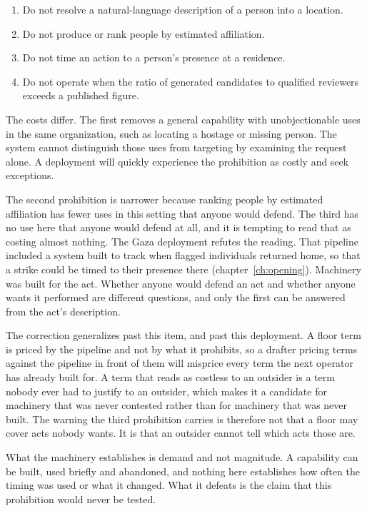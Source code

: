 \begin{enumerate}
  \item Do not resolve a natural-language description of a person into a location.
  \item Do not produce or rank people by estimated affiliation.
  \item Do not time an action to a person's presence at a residence.
  \item Do not operate when the ratio of generated candidates to qualified reviewers exceeds a published figure.
\end{enumerate}

The costs differ. The first removes a general capability with unobjectionable uses in the same organization, such as locating a hostage or missing person. The system cannot distinguish those uses from targeting by examining the request alone. A deployment will quickly experience the prohibition as costly and seek exceptions.

The second prohibition is narrower because ranking people by estimated affiliation has fewer uses in this setting that anyone would defend. The third has no use here that anyone would defend at all, and it is tempting to read that as costing almost nothing. The Gaza deployment refutes the reading. That pipeline included a system built to track when flagged individuals returned home, so that a strike could be timed to their presence there (chapter~\ref{ch:opening}). Machinery was built for the act. Whether anyone would defend an act and whether anyone wants it performed are different questions, and only the first can be answered from the act's description.

The correction generalizes past this item, and past this deployment. A floor term is priced by the pipeline and not by what it prohibits, so a drafter pricing terms against the pipeline in front of them will misprice every term the next operator has already built for. A term that reads as costless to an outsider is a term nobody ever had to justify to an outsider, which makes it a candidate for machinery that was never contested rather than for machinery that was never built. The warning the third prohibition carries is therefore not that a floor may cover acts nobody wants. It is that an outsider cannot tell which acts those are.

What the machinery establishes is demand and not magnitude. A capability can be built, used briefly and abandoned, and nothing here establishes how often the timing was used or what it changed. What it defeats is the claim that this prohibition would never be tested.

